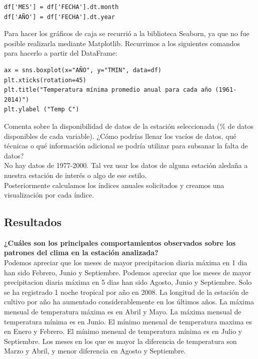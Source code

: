 \documentclass[12pt]{article}
\begin{document}
\begin{center}
\begin{verbatim}
df['MES'] = df['FECHA'].dt.month
df['AÑO'] = df['FECHA'].dt.year
 \end{verbatim}
\end{center} Para hacer los gráficos de caja se recurrió a la biblioteca Seaborn, ya que no fue posible realizarla mediante Matplotlib.
Recurrimos a los siguientes comandos para hacerlo a partir del DataFrame:
\begin{center}
\begin{verbatim}
ax = sns.boxplot(x="AÑO", y="TMIN", data=df)
plt.xticks(rotation=45)
plt.title("Temperatura mínima promedio anual para cada año (1961-2014)")
plt.ylabel ("Temp C")
 \end{verbatim}
\end{center}
Comenta sobre la disponibilidad de datos de la estación seleccionada (\% de datos disponibles de cada variable). ¿Cómo podrías llenar los vacíos de datos, qué técnicas o qué información adicional se podría utilizar para subsanar la falta de datos?\\
No hay datos de 1977-2000. Tal vez usar los datos de alguna estación aledaña a nuestra estación de interés o algo de ese estilo. 
\\
Posteriormente calculamos los índices anuales solicitados y creamos una visualización por cada índice.
\newpage
\subsection{Resultados}
\noindent\textbf {¿Cuáles son los principales comportamientos observados sobre los patrones del clima en la estación analizada?} \\
Podemos apreciar que los meses de mayor precipitacion diaria máxima en 1 dia han sido Febrero, Junio y Septiembre.
Podemos apreciar que los meses de mayor precipitacion diaria máxima en 5 dias han sido Agosto, Junio y Septiembre.
Solo se ha registrado 1 noche tropical por año en 2008.
La longitud de la estación de cultivo por año ha aumentado considerablemente en los últimos años. 
La máxima mensual de temperatura máxima es en Abril y Mayo. 
La máxima mensual de temperatura mínima es en Junio.
El mínimo mensual de temperatura maxima es en Enero y Febrero. 
El mínimo mensual de temperatura mínima es en Julio y Septiembre.
Los meses en los que es mayor la diferencia de temperatura son Marzo y Abril, y menor diferencia en Agosto y Septiembre.
\end{document}

